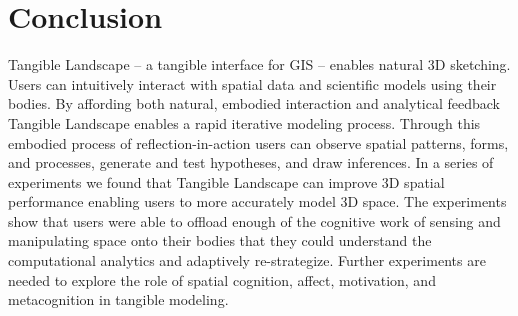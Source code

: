 \documentclass[prodmode,acmtochi]{acmsmall} %
\begin{document}
\section{Conclusion}

% 
%


Tangible Landscape -- a tangible interface for GIS -- 
enables natural 3D sketching. %
%
Users can intuitively interact with 
spatial data and scientific models using their bodies. 
% 
By affording both natural, embodied interaction and analytical feedback
Tangible Landscape enables a
rapid iterative modeling process.
%
Through this embodied process of reflection-in-action 
users can 
observe spatial patterns, forms, and processes, 
generate and test hypotheses, 
and draw inferences. 
%
In a series of experiments we found that 
Tangible Landscape can improve 3D spatial performance  
enabling users to more accurately model 3D space. 
%
The experiments show that users 
were able to offload enough of the cognitive work 
of sensing and manipulating space
onto their bodies
that they could understand the
computational analytics
and adaptively re-strategize.
%
Further experiments are needed
to explore the role of 
spatial cognition, affect, motivation, and metacognition 
in tangible modeling.







\end{document}
